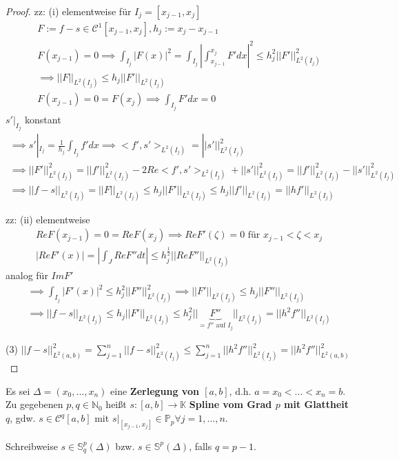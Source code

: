 \begin{proof}
	zz: (i) elementweise für $I_j = [x_{j-1}, x_j]$
	\begin{align*}
		F := f-s \in \mathcal{C}^1[x_{j-1}, x_j], h_j := x_j - x_{j-1}\\
		F(x_{j-1}) = 0 \implies \int_{I_j} |F(x)|^2 = \int_{I_j} \left|\int_{x_{j-1}}^{x_j} F' dx \right|^2 \leq h_j^2 ||F'||_{L^2(I_j)}^2\\
		\implies ||F||_{L^2(I_j)} \leq h_j ||F'||_{L^2(I_j)}\\
		F(x_{j-1}) = 0 = F(x_j) \implies \int_{I_j}F' dx = 0
	\end{align*}
	$s'|_{I_j}$ konstant
	\begin{align*}
		\implies s'|_{I_j} = \frac{1}{h_j} \int_{I_j}f' dx \implies <f', s'>_{L^2(I_j)} = ||s'||_{L^2(I_j)}^2\\
		\implies ||F'||_{L^2(I_j)}^2 = ||f'||_{L^2(I_j)}^2 - 2 Re<f', s'>_{L^2(I_j)} + ||s'||_{L^2(I_j)}^2 = ||f'||_{L^2(I_j)}^2 - ||s'||_{L^2(I_j)}^2\\
		\implies ||f-s||_{L^2(I_j)} = ||F||_{L^2(I_j)} \leq h_j ||F'||_{L^2(I_j)} \leq h_j ||f'||_{L^2(I_j)} = ||hf'||_{L^2(I_j)}
	\end{align*}
	
	zz: (ii) elementweise
	\begin{align*}
		Re F(x_{j-1}) = 0 = ReF(x_j) \implies Re F'(\zeta) = 0 \text{ für } x_{j-1} < \zeta < x_j\\
		|Re F'(x)| = | \int_{J} Re F'' dt| \leq h_j^{\frac{1}{2}} ||Re F''||_{L^2(I_j)}
	\end{align*}
	analog für $Im F'$
	\begin{align*}
		\implies \int_{I_j}|F'(x)|^2 \leq h_j^2 ||F''||_{L^2(I_j)}^2 \implies ||F'||_{L^2(I_j)} \leq h_j ||F''||_{L^2(I_j)}\\
		\implies ||f-s||_{L^2(I_j)} \leq h_j ||F'||_{L^2(I_j)} \leq h_j^2 ||\underbrace{F''}_{= f'' \text{ auf } I_j}||_{L^2(I_j)} = ||h^2 f''||_{L^2(I_j)}
	\end{align*}
	
	(3) $||f-s||_{L^2(a,b)}^2 = \sum_{j=1}^{n} ||f-s||_{L^2(I_j)}^2 \leq \sum_{j=1}^{n} ||h^2 f''||_{L^2(I_j)}^2 = ||h^2 f''||_{L^2(a,b)}^2$
\end{proof}

\begin{definition}
	Es sei $\Delta = (x_0, ..., x_n)$ eine \textbf{Zerlegung von $[a,b]$}, d.h. $a = x_0 < ... < x_n = b$. Zu gegebenen $p,q \in \mathbb{N}_0$ heißt $s:[a,b]\rightarrow\mathbb{K}$ \textbf{Spline vom Grad $p$ mit Glattheit $q$}, gdw. $s \in \mathcal{C}^q[a,b]$ mit $s|_{[x_{j-1}, x_j]} \in \mathbb{P}_p \forall j=1, ..., n$.
	
	Schreibweise $s \in \mathbb{S}_q^p(\Delta)$ bzw. $s \in \mathbb{S}^p(\Delta)$, falls $q=p-1$.
\end{definition}

